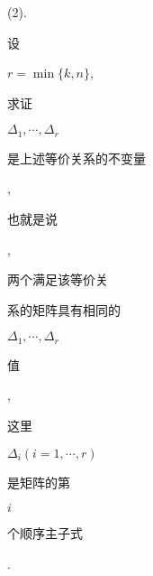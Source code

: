 \documentclass[10pt]{article}
\begin{document}
(2). \begin{CJK}{UTF8}{mj}设\end{CJK} $r=\min \{k, n\}$, \begin{CJK}{UTF8}{mj}求证\end{CJK} $\Delta_{1}, \cdots, \Delta_{r}$ \begin{CJK}{UTF8}{mj}是上述等价关系的不变量\end{CJK}, \begin{CJK}{UTF8}{mj}也就是说\end{CJK}, \begin{CJK}{UTF8}{mj}两个满足该等价关\end{CJK} \begin{CJK}{UTF8}{mj}系的矩阵具有相同的\end{CJK} $\Delta_{1}, \cdots, \Delta_{r}$ \begin{CJK}{UTF8}{mj}值\end{CJK}, \begin{CJK}{UTF8}{mj}这里\end{CJK} $\Delta_{i}(i=1, \cdots, r)$ \begin{CJK}{UTF8}{mj}是矩阵的第\end{CJK} $i$ \begin{CJK}{UTF8}{mj}个顺序主子式\end{CJK}.
\end{document}
